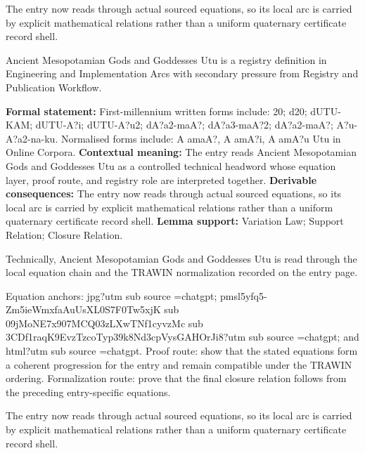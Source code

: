 The entry now reads through actual sourced equations, so its local arc is carried by explicit mathematical relations rather than a uniform quaternary certificate record shell.
\clearpage


\begingroup\small
{}
Ancient Mesopotamian Gods and Goddesses Utu is a registry definition in Engineering and Implementation Arcs with secondary pressure from Registry and Publication Workflow.

\begingroup\footnotesize\setlength{\emergencystretch}{3em}\sloppy
\textbf{Formal statement:} First-millennium written forms include: 20; d20; dUTU-KAM; dUTU-A?i; dUTU-A?u2; dA?a2-maA?; dA?a3-maA?2; dA?a2-maA?; A?u-A?a2-na-ku. Normalised forms include: A amaA?, A amA?i, A amA?u Utu in Online Corpora. \textbf{Contextual meaning:} The entry reads Ancient Mesopotamian Gods and Goddesses Utu as a controlled technical headword whose equation layer, proof route, and registry role are interpreted together. \textbf{Derivable consequences:} The entry now reads through actual sourced equations, so its local arc is carried by explicit mathematical relations rather than a uniform quaternary certificate record shell. \textbf{Lemma support:} Variation Law; Support Relation; Closure Relation.\par
\endgroup

Technically, Ancient Mesopotamian Gods and Goddesses Utu is read through the local equation chain and the TRAWIN normalization recorded on the entry page.

Equation anchors: jpg?utm sub source =chatgpt; pmsl5yfq5-Zm5ieWmxfaAuUsXL0S7F0Tw5xjK sub 09jMoNE7x907MCQ03zLXwTNf1cyvzMc sub 3CDf1raqK9EvzTzcoTyp39k8Nd3cpVysGAHOrJi8?utm sub source =chatgpt; and html?utm sub source =chatgpt. Proof route: show that the stated equations form a coherent progression for the entry and remain compatible under the TRAWIN ordering. Formalization route: prove that the final closure relation follows from the preceding entry-specific equations.

The entry now reads through actual sourced equations, so its local arc is carried by explicit mathematical relations rather than a uniform quaternary certificate record shell.
\endgroup

